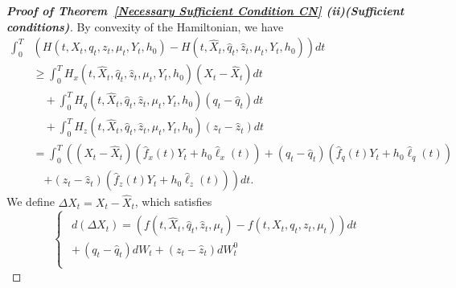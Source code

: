 \documentclass[11pt,a4paper]{article}
\begin{document}
\begin{proof} [\textup{\textbf{Proof of Theorem~\ref{Necessary Sufficient Condition CN} (ii)(Sufficient conditions)}}]
By convexity of the Hamiltonian, we have
\begin{equation}
\label{Convexity Hamiltonian CN}
\begin{split}
     \int_0^T &\left(H(t,X_t,  q_t, z_t, \mu_t, Y_t, h_0)-H(t, \hat X_t,  \hat q_t, \hat z_t, \mu_t, Y_t,h_0)\right)dt \\ 
   & \geq \int_0^T  H_x(t, \hat X_t,  \hat q_t, \hat z_t, \mu_t,  Y_t, h_0)( X_t- \hat X_t ) dt \\
   & \quad  +\int_0^T  H_q(t, \hat X_t,  \hat q_t, \hat z_t, \mu_t, Y_t,h_0)( q_t- \hat q_t) dt\\
   & \quad +\int_0^T H_z(t, \hat X_t,  \hat q_t, \hat z_t, \mu_t, Y_t,h_0)( z_t- \hat z_t)dt\\
    & = \int_0^T\left( (X_t- \hat X_t)( \hat f_x(t) Y_t+h_0 \hat \ell_x(t))+(q_t-\hat q_t) (\hat f_q(t) Y_t+h_0 \hat \ell_q(t)) \right .\\
   & \quad \left. +(z_t-\hat z_t)(\hat f_z(t)Y_t+h_0 \hat \ell_z(t)) \right)dt. 
\end{split}
\end{equation}
    We define $\Delta X_t = X_t-\hat X_t $, which satisfies
\begin{equation}
\label{difference CN}
\begin{cases}
\begin{aligned}
    d(\Delta X_t)= \left(f(t, \hat X_t, \hat q_t, \hat z_t, \mu_t)-f(t,  X_t, q_t, z_t, \mu_t) \right)dt\\ +\,(q_t-\hat q_t)dW_t+(z_t-\hat z_t)dW_t^0
\end{aligned}\\
  

\end{cases}
\end{equation}
\end{proof}
\end{document}
